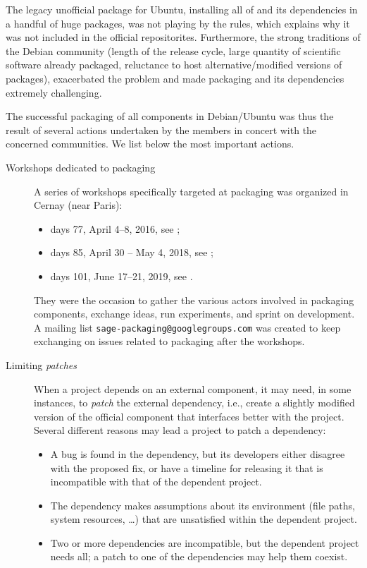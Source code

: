 \documentclass{deliverablereport}
\begin{document}
The legacy unofficial \Sage package for Ubuntu,
installing all of \Sage and its dependencies in a handful of huge
packages, was not playing by the rules, which explains why it was not
included in the official repositorites. %
Furthermore, the strong traditions of the Debian community (length of
the release cycle, large quantity of scientific software already
packaged, reluctance to host alternative/modified versions of
packages), exacerbated the problem and made packaging \Sage and its
dependencies extremely challenging.

The successful packaging of all \ODK components in Debian/Ubuntu was
thus the result of several actions undertaken by the \ODK members in
concert with the concerned communities. %
We list below the most important actions.

\begin{description}
\item[Workshops dedicated to packaging] A series of workshops
  specifically targeted at packaging was organized in Cernay (near
  Paris):
  \begin{itemize}
  \item \Sage days 77, April 4--8, 2016, see ;
  \item \Sage days 85, April 30 -- May 4, 2018, see ;
  \item \Sage days 101, June 17--21, 2019, see .
  \end{itemize}
  They were the occasion to gather the various actors involved in
  packaging \ODK components, exchange ideas, run experiments, and
  sprint on development. %
  A mailing list \texttt{sage-packaging@googlegroups.com} was created
  to keep exchanging on issues related to packaging after the
  workshops.

\item[Limiting \emph{patches}] When a project depends on an external
  component, it may need, in some instances, to \emph{patch} the
  external dependency, i.e., create a slightly modified version of the
  official component that interfaces better with the project. %
  Several different reasons may lead a project to patch a dependency:
  \begin{itemize}
  \item A bug is found in the dependency, but its developers either
    disagree with the proposed fix, or have a timeline for releasing
    it that is incompatible with that of the dependent project.
  \item The dependency makes assumptions about its environment (file
    paths, system resources, \dots) that are unsatisfied within the
    dependent project.
  \item Two or more dependencies are incompatible, but the dependent
    project needs all; a patch to one of the dependencies may help
    them coexist.
  \end{itemize}


\end{description}
\end{document}
